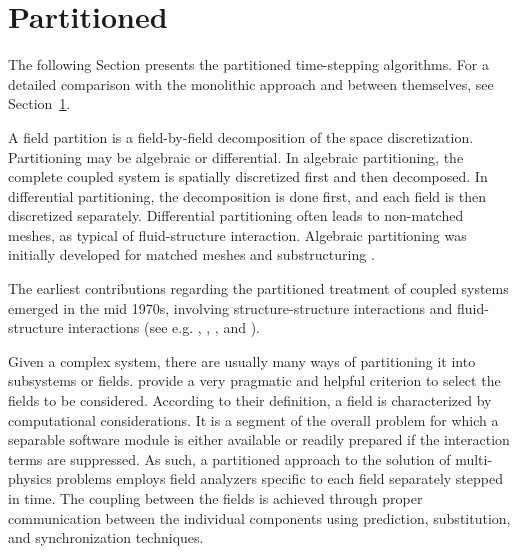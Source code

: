 \section{Partitioned}

The following Section presents the partitioned time-stepping algorithms.
For a detailed comparison with the monolithic approach and between themselves, see Section~\ref{}.

A field partition is a field-by-field decomposition of the space discretization.
Partitioning may be algebraic or differential.
In algebraic partitioning, the complete coupled system is spatially discretized first and then decomposed.
In differential partitioning, the decomposition is done first, and each field is then discretized separately.
Differential partitioning often leads to non-matched meshes, as typical of fluid-structure interaction.
Algebraic partitioning was initially developed for matched meshes and substructuring \citep{felippa_partitioned_2001}.

The earliest contributions regarding the partitioned treatment of coupled systems emerged in the mid 1970s, involving structure-structure interactions and fluid-structure interactions (see e.g. \cite{belytschko_mesh_1976}, \cite{park_stabilization_1977}, \cite{belytschko_stability_1978}, \cite{hughes_implicit-explicit_1978} and \cite{belytschko_mixed_1979}).


Given a complex system, there are usually many ways of partitioning it into subsystems or fields.
\cite{felippa_staggered_1980} provide a very pragmatic and helpful criterion to select the fields to be considered.
According to their definition, a field is characterized by computational considerations.
It is a segment of the overall problem for which a separable software module is either available or readily prepared if the interaction terms are suppressed.
As such, a partitioned approach to the solution of multi-physics problems employs field analyzers specific to each field separately stepped in time.
The coupling between the fields is achieved through proper communication between the individual components using prediction, substitution, and synchronization techniques.


